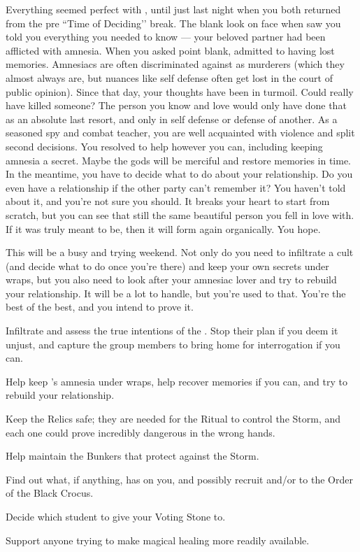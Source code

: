 \documentclass[char]{GL2020}
\begin{document}
Everything seemed perfect with \cLibrarian{}, until just last night when you both returned from the pre ``Time of Deciding’’ break. The blank look on \cLibrarian{\their} face when \cLibrarian{\they} saw you told you everything you needed to know — your beloved partner had been afflicted with amnesia. When you asked \cLibrarian{\them} point blank, \cLibrarian{\they} admitted to having lost \cLibrarian{\their} memories. Amnesiacs are often discriminated against as murderers (which they almost always are, but nuances like self defense often get lost in the court of public opinion). Since that day, your thoughts have been in turmoil. Could \cLibrarian{} really have killed someone? The person you know and love would only have done that as an absolute last resort, and only in self defense or defense of another. As a seasoned spy and combat teacher, you are well acquainted with violence and split second decisions. You resolved to help \cLibrarian{} however you can, including keeping \cLibrarian{\their} amnesia a secret. Maybe the gods will be merciful and restore \cLibrarian{\their} memories in time. In the meantime, you have to decide what to do about your relationship. Do you even have a relationship if the other party can't remember it? You haven't told \cLibrarian{\them} about it, and you're not sure you should. It breaks your heart to start from scratch, but you can see that \cLibrarian{\they} \cLibrarian{\are} still the same beautiful person you fell in love with. If it was truly meant to be, then it will form again organically. You hope.  

This will be a busy and trying weekend. Not only do you need to infiltrate a cult (and decide what to do once you're there) and keep your own secrets under wraps, but you also need to look after your amnesiac lover and try to rebuild your relationship. It will be a lot to handle, but you're used to that. You're the best of the best, and you intend to prove it.

\begin{itemz}
    \item Infiltrate and assess the true intentions of the \pGoaties{}. Stop their plan if you deem it unjust, and capture the group members to bring home for interrogation if you can.
    \item Help keep \cLibrarian{}'s amnesia under wraps, help \cLibrarian{\them} recover \cLibrarian{\their} memories if you can, and try to rebuild your relationship.
    \item Keep the Relics safe; they are needed for the Ritual to control the Storm, and each one could prove incredibly dangerous in the wrong hands.
    \item Help \cBunker{} maintain the Bunkers that protect against the Storm.
    \item Find out what, if anything, \cLibAssist{} has on you, and possibly recruit \cLibAssist{\them} and/or \cPirateChild{} to the Order of the Black Crocus.
    \item Decide which student to give your Voting Stone to.
    \item Support anyone trying to make magical healing more readily available.
\end{itemz}
\end{document}
